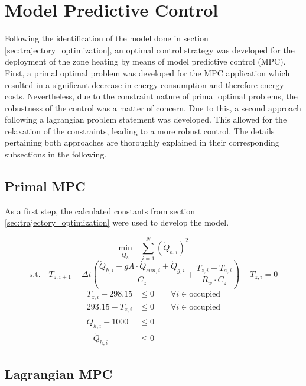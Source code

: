 \section{Model Predictive Control}
\label{sec:mpc}
Following the identification of the model done in section \ref{sec:trajectory_optimization}, an optimal control strategy was developed for the deployment of the zone heating by means of model predictive control (MPC). First, a primal optimal problem was developed for the MPC application which resulted in a significant decrease in energy consumption and therefore energy costs. Nevertheless, due to the constraint nature of primal optimal problems, the robustness of the control was a matter of concern. Due to this, a second approach following a lagrangian problem statement was developed. This allowed for the relaxation of the constraints, leading to a more robust control. The details pertaining both approaches are thoroughly explained in their corresponding subsections in the following.

\subsection{Primal MPC}
\label{subsec:primal_mpc}
As a first step, the calculated constants from section \ref{sec:trajectory_optimization} were used to develop the model. 

\begin{equation}
\underset{\dot{Q}_h}{\text{min}} \hspace{1em} \sum_{i=1}^{N} \left(\dot{Q}_{h,i}\right)^2
\end{equation}
\begin{equation}
\text{s.t.}  \hspace{1em} T_{z,i+1} - \Delta t \left( \frac{\dot{Q}_{h,i} + gA \cdot \dot{Q}_{sun, i} + \dot{Q}_{g,i}}{C_z} + \frac{T_{z,i}-T_{a,i}}{R_w \cdot C_z} \right) - T_{z,i} =0
\end{equation}
\begin{align}
T_{z,i} - 298.15 &\leq 0 \hspace{2em} \forall i \in \text{occupied}\\[0.5em]
293.15 - T_{z,i} &\leq 0 \hspace{2em} \forall i \in \text{occupied}\\[0.5em]
\dot{Q}_{h,i} - 1000 &\leq 0\\[0.5em]
-\dot{Q}_{h,i} &\leq 0
\end{align}


\subsection{Lagrangian MPC}
\label{subsec:lagrangian_mpc}
